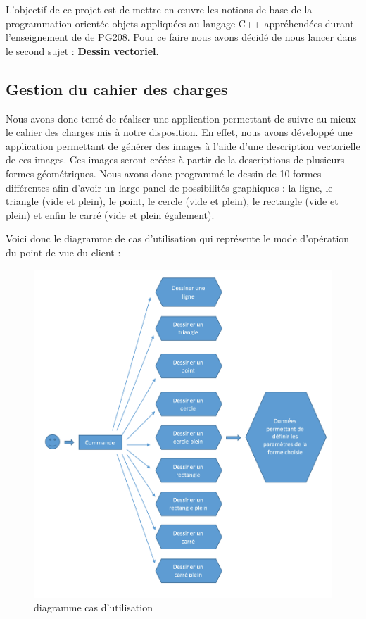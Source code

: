 \documentclass[11pt]{article}
\begin{document}
L'objectif de ce projet est de mettre en œuvre les notions de base de la programmation orientée objets appliquées au langage C++ appréhendées durant l’enseignement de de PG208. Pour ce faire nous avons décidé de nous lancer dans le second sujet : \textbf{Dessin vectoriel}.

\subsection{Gestion du cahier des charges}
Nous avons donc tenté de réaliser une application permettant de suivre au mieux le cahier des charges mis à notre disposition. En effet, nous avons développé une application permettant de générer des images à l’aide d’une description vectorielle de ces images. Ces images seront créées à partir de la descriptions de plusieurs formes géométriques. Nous avons donc programmé le dessin de 10 formes différentes afin d'avoir un large panel de possibilités graphiques : la ligne, le triangle (vide et plein), le point, le cercle (vide et plein), le rectangle (vide et plein) et enfin le carré (vide et plein également). 

Voici donc le diagramme de cas d'utilisation qui représente le mode d'opération du point de vue du client :

\begin{figure}[!htbp]
    \begin{center}
        \includegraphics[width=13cm]{Photo1.png}
        \caption{diagramme cas d'utilisation}
    \centering
    \end{center}
\end{figure}
\end{document}
